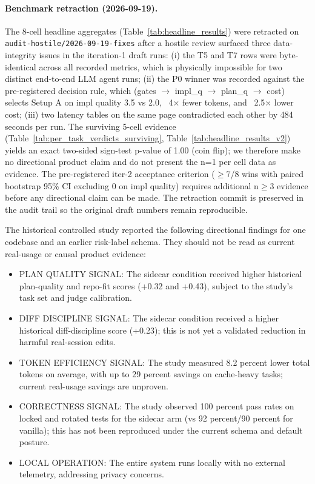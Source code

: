 \label{sec:discussion-retraction}
\paragraph{Benchmark retraction (2026-09-19).}
The 8-cell headline aggregates (Table~\ref{tab:headline_results})
were retracted on \texttt{audit-hostile/2026-09-19-fixes} after a
hostile review surfaced three data-integrity issues in the
iteration-1 draft runs: (i) the T5 and T7 rows were byte-identical
across all recorded metrics, which is physically impossible for two
distinct end-to-end LLM agent runs; (ii) the P0 winner was recorded
against the pre-registered decision rule, which (gates
$\rightarrow$ impl\_q $\rightarrow$ plan\_q $\rightarrow$ cost)
selects Setup A on impl quality 3.5 vs 2.0, ~4$\times$ fewer tokens,
and ~2.5$\times$ lower cost; (iii) two latency tables on the same
page contradicted each other by 484 seconds per run. The surviving
5-cell evidence (Table~\ref{tab:per_task_verdicts_surviving},
Table~\ref{tab:headline_results_v2}) yields an exact two-sided
sign-test p-value of 1.00 (coin flip); we therefore make no
directional product claim and do not present the n=1 per cell data
as evidence. The pre-registered iter-2 acceptance criterion
($\geq$7/8 wins with paired bootstrap 95\% CI excluding 0 on impl
quality) requires additional n$\geq$3 evidence before any directional
claim can be made. The retraction commit is preserved in the audit
trail so the original draft numbers remain reproducible.



The historical controlled study reported the following directional findings
for one codebase and an earlier risk-label schema. They should not be read as
current real-usage or causal product evidence:

\begin{itemize}
    \item PLAN QUALITY SIGNAL: The sidecar condition received higher historical plan-quality and repo-fit scores (+0.32 and +0.43), subject to the study's task set and judge calibration.
    \item DIFF DISCIPLINE SIGNAL: The sidecar condition received a higher historical diff-discipline score (+0.23); this is not yet a validated reduction in harmful real-session edits.
    \item TOKEN EFFICIENCY SIGNAL: The study measured 8.2 percent lower total tokens on average, with up to 29 percent savings on cache-heavy tasks; current real-usage savings are unproven.
    \item CORRECTNESS SIGNAL: The study observed 100 percent pass rates on locked and rotated tests for the sidecar arm (vs 92 percent/90 percent for vanilla); this has not been reproduced under the current schema and default posture.
    \item LOCAL OPERATION: The entire system runs locally with no external telemetry, addressing privacy concerns.
\end{itemize}

